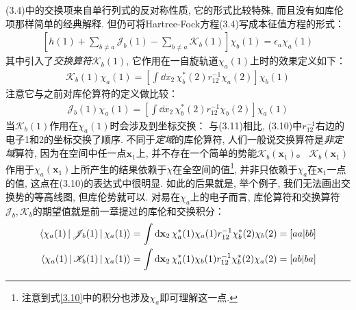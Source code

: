 (3.4)中的交换项来自单行列式的反对称性质, 它的形式比较特殊, 而且没有如库伦项那样简单的经典解释. 
但仍可将Hartree-Fock方程(3.4)写成本征值方程的形式：
\begin{align}
	\left[ h(1) + \sum_{b\neq a}\mathscr{J}_b(1) - \sum_{b\neq a}\mathscr{K}_b(1)   \right]\chi_b(1) = \epsilon_a\chi_a(1)
\end{align}
其中引入了\emph{交换算符}$\mathscr{K}_b(1)$, 
它作用在一自旋轨道$\chi_a(1)$上时的效果定义如下：
\begin{align}
	\label{3.10}
	\mathscr{K}_b(1)\chi_a(1) = \left[ \int\dd{x}_2\,\chi_b^*(2)r_{12}^{-1}\chi_a(2) \right]\chi_b(1)
\end{align}
注意它与之前对库伦算符的定义做比较：
\begin{align}
	\label{3.11}
	\mathscr{J}_b(1)\chi_a(1) = \left[ \int\dd{x}_2\,\chi_b^*(2)r_{12}^{-1}\chi_b(2) \right]\chi_a(1)
\end{align}
当$\mathscr{K}_b(1)$作用在$\chi_a(1)$时会涉及到坐标交换：
与(3.11)相比, (3.10)中$r_{12}^{-1}$右边的电子1和2的坐标交换了顺序. 
不同于\emph{定域}的库伦算符, 人们一般说交换算符是\emph{非定域}算符, 
因为在空间中任一点$\mathbf{x}_1$上, 并不存在一个简单的势能$\mathscr{K}_b(\mathbf{x}_1)$。 $\mathscr{K}_b(\mathbf{x}_1)$作用于$\chi_a(\mathbf{x}_1)$上所产生的结果依赖于$\chi$在全空间的值\footnote{
	注意到式\eqref{3.10}中的积分也涉及$\chi_a$即可理解这一点.
}, 
并非只依赖于$\chi_a$在$\mathbf{x}_1$一点的值, 这点在(3.10)的表达式中很明显. 
如此的后果就是, 举个例子, 我们无法画出交换势的等高线图, 但库伦势就可以. 
对易在$\chi_a$上的电子而言, 库伦算符和交换算符$\mathscr{J}_b,\mathscr{K}_b$的期望值就是前一章提过的库伦和交换积分：
\begin{align}
	\braket{\chi_a(1)|\mathscr{J}_b(1)|\chi_a(1)} & = \int\dd{x}_2\,\chi_a^*(1)\chi_a(1)r_{12}^{-1}\chi_b^*(2)\chi_b(2) = [aa|bb]\\
	\braket{\chi_a(1)|\mathscr{K}_b(1)|\chi_a(1)} & = \int\dd{x}_2\,\chi_a^*(1)\chi_b(1)r_{12}^{-1}\chi_b^*(2)\chi_a(2) = [ab|ba]
\end{align}


